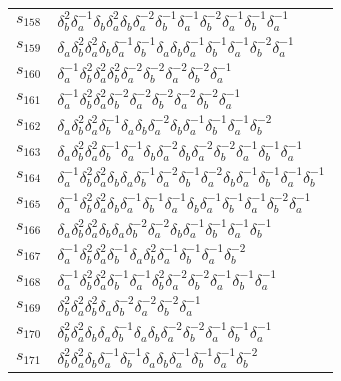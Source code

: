 \documentclass{article}
\begin{document}
\begin{center}
\begin{tabular}{ll}
$s_{158}$ & $\delta_b^{2}\delta_a^{-1}\delta_b^{}\delta_a^{2}\delta_b^{}\delta_a^{-2}\delta_b^{-1}\delta_a^{-1}\delta_b^{-2}\delta_a^{-1}\delta_b^{-1}\delta_a^{-1}$ \\
$s_{159}$ & $\delta_a^{}\delta_b^{2}\delta_a^{2}\delta_b^{}\delta_a^{-1}\delta_b^{-1}\delta_a^{}\delta_b^{}\delta_a^{-1}\delta_b^{-1}\delta_a^{-1}\delta_b^{-2}\delta_a^{-1}$ \\
$s_{160}$ & $\delta_a^{-1}\delta_b^{2}\delta_a^{2}\delta_b^{2}\delta_a^{-2}\delta_b^{-2}\delta_a^{-2}\delta_b^{-2}\delta_a^{-1}$ \\
$s_{161}$ & $\delta_a^{-1}\delta_b^{2}\delta_a^{2}\delta_b^{-2}\delta_a^{-2}\delta_b^{-2}\delta_a^{-2}\delta_b^{-2}\delta_a^{-1}$ \\
$s_{162}$ & $\delta_a^{}\delta_b^{2}\delta_a^{2}\delta_b^{-1}\delta_a^{}\delta_b^{}\delta_a^{-2}\delta_b^{}\delta_a^{-1}\delta_b^{-1}\delta_a^{-1}\delta_b^{-2}$ \\
$s_{163}$ & $\delta_a^{}\delta_b^{2}\delta_a^{2}\delta_b^{-1}\delta_a^{-1}\delta_b^{}\delta_a^{-2}\delta_b^{}\delta_a^{-2}\delta_b^{-2}\delta_a^{-1}\delta_b^{-1}\delta_a^{-1}$ \\
$s_{164}$ & $\delta_a^{-1}\delta_b^{2}\delta_a^{2}\delta_b^{}\delta_a^{}\delta_b^{-1}\delta_a^{-2}\delta_b^{-1}\delta_a^{-2}\delta_b^{}\delta_a^{-1}\delta_b^{-1}\delta_a^{-1}\delta_b^{-1}$ \\
$s_{165}$ & $\delta_a^{-1}\delta_b^{2}\delta_a^{2}\delta_b^{}\delta_a^{-1}\delta_b^{-1}\delta_a^{-1}\delta_b^{}\delta_a^{-1}\delta_b^{-1}\delta_a^{-1}\delta_b^{-2}\delta_a^{-1}$ \\
$s_{166}$ & $\delta_a^{}\delta_b^{2}\delta_a^{2}\delta_b^{}\delta_a^{}\delta_b^{-2}\delta_a^{-2}\delta_b^{}\delta_a^{-1}\delta_b^{-1}\delta_a^{-1}\delta_b^{-1}$ \\
$s_{167}$ & $\delta_a^{-1}\delta_b^{2}\delta_a^{2}\delta_b^{-1}\delta_a^{}\delta_b^{2}\delta_a^{-1}\delta_b^{-1}\delta_a^{-1}\delta_b^{-2}$ \\
$s_{168}$ & $\delta_a^{-1}\delta_b^{2}\delta_a^{2}\delta_b^{-1}\delta_a^{-1}\delta_b^{2}\delta_a^{-2}\delta_b^{-2}\delta_a^{-1}\delta_b^{-1}\delta_a^{-1}$ \\
$s_{169}$ & $\delta_b^{2}\delta_a^{2}\delta_b^{2}\delta_a^{}\delta_b^{-2}\delta_a^{-2}\delta_b^{-2}\delta_a^{-1}$ \\
$s_{170}$ & $\delta_b^{2}\delta_a^{2}\delta_b^{}\delta_a^{}\delta_b^{-1}\delta_a^{}\delta_b^{}\delta_a^{-2}\delta_b^{-2}\delta_a^{-1}\delta_b^{-1}\delta_a^{-1}$ \\
$s_{171}$ & $\delta_b^{2}\delta_a^{2}\delta_b^{}\delta_a^{-1}\delta_b^{-1}\delta_a^{}\delta_b^{}\delta_a^{-1}\delta_b^{-1}\delta_a^{-1}\delta_b^{-2}$ \\

\end{tabular}
\end{center}
\end{document}
